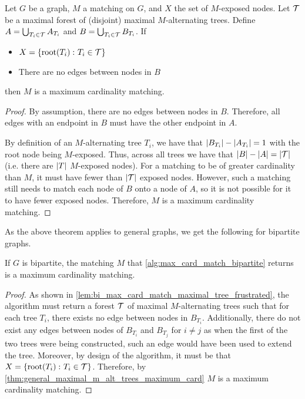 \begin{theorem}
    Let $G$ be a graph, $M$ a matching on $G$, and $X$ the set of $M$-exposed nodes. Let $\calT$ be a maximal forest of (disjoint) maximal $M$-alternating trees.  
    Define $A = \bigcup_{T_i \in \calT} A_{T_i}$ and $B = \bigcup_{T_i \in \calT} B_{T_i}$. If 
    \begin{itemize}[label=--]
        \item $X = \lrc{\f[\mathrm{root}]{T_i} \colon T_i \in \calT}$
        \item There are no edges between nodes in $B$ 
    \end{itemize}
    then $M$ is a maximum cardinality matching. 
    \label{thm:general_maximal_m_alt_trees_maximum_card}
\end{theorem}
\begin{proof}
    By assumption, there are no edges between nodes in $B$. 
    Therefore, all edges with an endpoint in $B$ must have the other endpoint in $A$. 

    By definition of an $M$-alternating tree $T_i$, we have that $\abs{B_{T_i}} - \abs{A_{T_i}} = 1$ with the root node being $M$-exposed. Thus, across all trees we have that 
    $\abs{B} - \abs{A} = \abs{\calT}$ (i.e.\! there are $\abs{T}$ $M$-exposed nodes). 
    For a matching to be of greater cardinality than $M$, it must have fewer than $\abs{\calT}$ exposed nodes. 
    However, such a matching still needs to match each node of $B$ onto a node of $A$, so it is not possible for it to have fewer exposed nodes. 
    Therefore, $M$ is a maximum cardinality matching. 
\end{proof}

As the above theorem applies to general graphs, we get the following for bipartite graphs.  

\begin{theorem}
    If $G$ is bipartite, the matching $M$ that \cref{alg:max_card_match_bipartite} returns is a maximum cardinality matching. 
    \label{thm:bipartite_max_card_matching}
\end{theorem}
\begin{proof}
    As shown in \cref{lem:bi_max_card_match_maximal_tree_frustrated}, the algorithm must 
    return a forest $\calT$ of maximal $M$-alternating trees such that for each tree $T_i$, there exists no edge between nodes in $B_{T_i}$. 
    Additionally, there do not exist any edges between nodes of $B_{T_i}$ and $B_{T_j}$ for $i \neq j$ as when the first of the two trees 
    were being constructed, such an edge would have been used to extend the tree. 
    Moreover, by design of the algorithm, it must be that $X = \lrc{\f[\mathrm{root}]{T_i} \colon T_i \in \calT}$. 
    Therefore, by \cref{thm:general_maximal_m_alt_trees_maximum_card} $M$ is a maximum cardinality matching. 
\end{proof}

